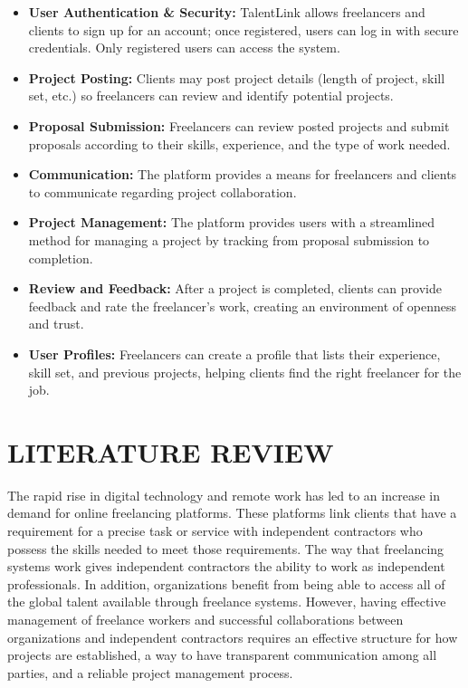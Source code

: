 \documentclass[12pt,a4paper,oneside]{report}
\numberwithin{figure}{chapter}
\numberwithin{table}{chapter}
\begin{document}
\begin{itemize}[leftmargin=2em]
  \item \textbf{User Authentication \& Security:} TalentLink allows freelancers and
        clients to sign up for an account; once registered, users can log in with secure
        credentials. Only registered users can access the system.
  \item \textbf{Project Posting:} Clients may post project details (length of project,
        skill set, etc.) so freelancers can review and identify potential projects.
  \item \textbf{Proposal Submission:} Freelancers can review posted projects and submit
        proposals according to their skills, experience, and the type of work needed.
  \item \textbf{Communication:} The platform provides a means for freelancers and clients
        to communicate regarding project collaboration.
  \item \textbf{Project Management:} The platform provides users with a streamlined method
        for managing a project by tracking from proposal submission to completion.
  \item \textbf{Review and Feedback:} After a project is completed, clients can provide
        feedback and rate the freelancer's work, creating an environment of openness and
        trust.
  \item \textbf{User Profiles:} Freelancers can create a profile that lists their
        experience, skill set, and previous projects, helping clients find the right
        freelancer for the job.
\end{itemize}

\chapter{LITERATURE REVIEW}

The rapid rise in digital technology and remote work has led to an increase in demand for
online freelancing platforms. These platforms link clients that have a requirement for a
precise task or service with independent contractors who possess the skills needed to meet
those requirements. The way that freelancing systems work gives independent contractors
the ability to work as independent professionals. In addition, organizations benefit from
being able to access all of the global talent available through freelance systems.
However, having effective management of freelance workers and successful collaborations
between organizations and independent contractors requires an effective structure for how
projects are established, a way to have transparent communication among all parties, and a
reliable project management process.
\end{document}

